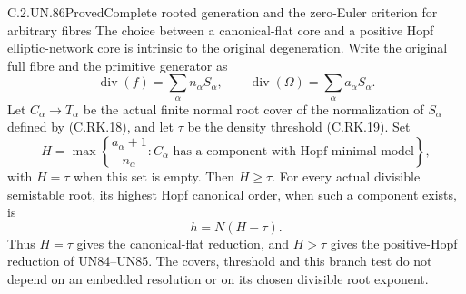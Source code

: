 \begin{statement}{C.2.UN.86}{Proved}{Complete rooted generation and the zero-Euler criterion for arbitrary fibres}
The choice between a canonical-flat core and a positive
Hopf elliptic-network core is intrinsic to the original
degeneration. Write the original full fibre and the
primitive generator as
\[
        \operatorname{div}(f)=\sum_\alpha n_\alpha S_\alpha,
        \qquad \operatorname{div}(\Omega)
                       =\sum_\alpha a_\alpha S_\alpha.
 \tag{C.AR.6}
\]
Let \(C_\alpha\to T_\alpha\) be the actual finite normal
root cover of the normalization of \(S_\alpha\) defined
by (C.RK.18), and let \(\tau\) be the density threshold
(C.RK.19). Set
\[
 H=\max\left\{\frac{a_\alpha+1}{n_\alpha}:
       C_\alpha\text{ has a component with Hopf minimal model}
       \right\},
 \tag{C.AR.7}
\]
with \(H=\tau\) when this set is empty. Then \(H\ge\tau\).
For every actual divisible semistable root, its highest
Hopf canonical order, when such a component exists, is
\[
                         h=N(H-\tau).
 \tag{C.AR.8}
\]
Thus \(H=\tau\) gives the canonical-flat reduction,
and \(H>\tau\) gives the positive-Hopf reduction of
UN84--UN85. The covers, threshold and this branch test
do not depend on an embedded resolution or on its
chosen divisible root exponent.
\end{statement}

